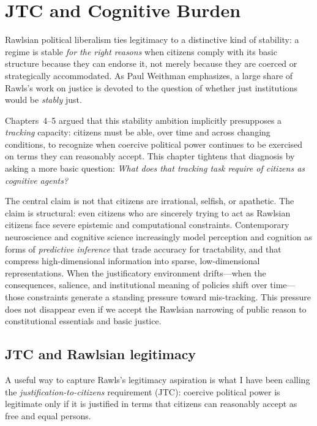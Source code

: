 \documentclass[12pt]{report}
\begin{document}
\chapter{JTC and Cognitive Burden}
\label{ch:jtc-cog-burden}

Rawlsian political liberalism ties legitimacy to a distinctive kind of stability: a regime is stable \emph{for the right reasons} when citizens comply with its basic structure because they can endorse it, not merely because they are coerced or strategically accommodated. As Paul Weithman emphasizes, a large share of Rawls's work on justice is devoted to the question of whether just institutions would be \emph{stably} just. \parencite[p.~1188]{Weithman2024Rescuing}

Chapters~4--5 argued that this stability ambition implicitly presupposes a \emph{tracking} capacity: citizens must be able, over time and across changing conditions, to recognize when coercive political power continues to be exercised on terms they can reasonably accept. This chapter tightens that diagnosis by asking a more basic question: \emph{What does that tracking task require of citizens as cognitive agents?}

The central claim is not that citizens are irrational, selfish, or apathetic. The claim is structural: even citizens who are sincerely trying to act as Rawlsian citizens face severe epistemic and computational constraints. Contemporary neuroscience and cognitive science increasingly model perception and cognition as forms of \emph{predictive inference} that trade accuracy for tractability, and that compress high-dimensional information into sparse, low-dimensional representations. When the justificatory environment drifts---when the consequences, salience, and institutional meaning of policies shift over time---those constraints generate a standing pressure toward mis-tracking. This pressure does not disappear even if we accept the Rawlsian narrowing of public reason to constitutional essentials and basic justice.

\section{JTC and Rawlsian legitimacy}
\label{sec:jtc-legitimacy}

A useful way to capture Rawls's legitimacy aspiration is what I have been calling the \emph{justification-to-citizens} requirement (JTC): coercive political power is legitimate only if it is justified in terms that citizens can reasonably accept as free and equal persons.
\end{document}
